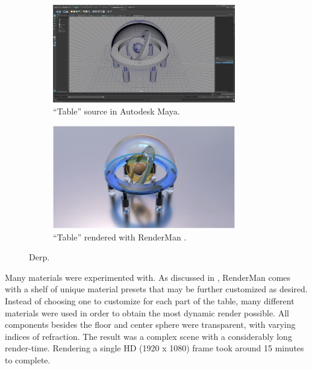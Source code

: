 \documentclass[conference]{IEEEtran}
\begin{document}
\begin{figure}[h!]
\centering
\begin{subfigure}{.5\textwidth}
\begin{center}
\begin{minipage}[t]{\linewidth}
\centerline{\includegraphics[width=8cm]{project1.png}}
\caption{``Table'' source in Autodesk Maya.}
\label{fig:environment}
\end{minipage}
\end{center}
\end{subfigure}
\par\bigskip
\begin{subfigure}{.5\textwidth}
\begin{center}
\begin{minipage}[t]{\linewidth}
\centerline{\includegraphics[width=8cm]{table.png}}
\caption{``Table'' rendered with RenderMan \cite{animation}.}
\label{fig:table}
\end{minipage}
\end{center}
\end{subfigure}
\caption{Derp.}
\label{fig:table_pair}
\end{figure}

Many materials were experimented with. As discussed in \cite{renderman},
RenderMan comes with a shelf of unique material presets that may be further customized as desired.
Instead of choosing one to customize for each part of the table,
many different materials were used in order to obtain the most dynamic render possible.
All components besides the floor and center sphere were transparent, with varying indices of refraction.
The result was a complex scene with a considerably long render-time.
Rendering a single HD (1920 x 1080) frame took around 15 minutes to complete.
\end{document}
